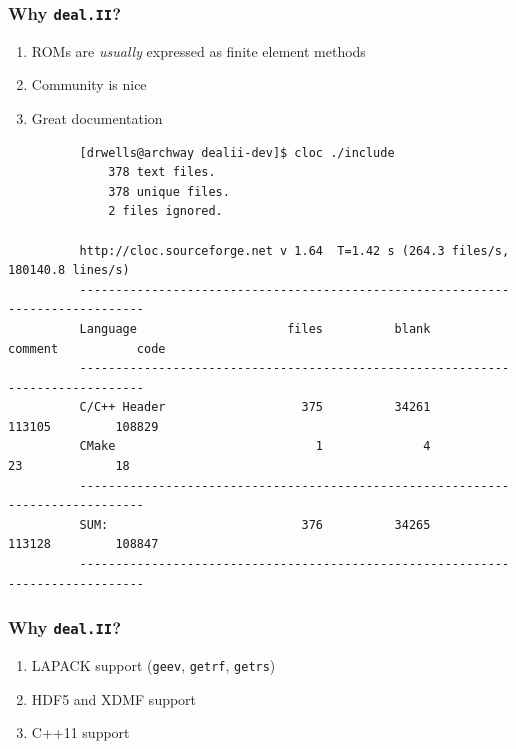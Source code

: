 \documentclass[mathserif]{beamer}
\begin{document}
\begin{frame}[fragile]
    \frametitle{Why \texttt{deal.II}?}
    \begin{enumerate}
        \item ROMs are \emph{usually} expressed as finite element methods
        \pause
        \item Community is nice
        \pause
        \item Great documentation
    \end{enumerate}

    \pause
    \begin{center}
        {\tiny
        \begin{verbatim}
          [drwells@archway dealii-dev]$ cloc ./include
              378 text files.
              378 unique files.
              2 files ignored.

          http://cloc.sourceforge.net v 1.64  T=1.42 s (264.3 files/s, 180140.8 lines/s)
          -------------------------------------------------------------------------------
          Language                     files          blank        comment           code
          -------------------------------------------------------------------------------
          C/C++ Header                   375          34261         113105         108829
          CMake                            1              4             23             18
          -------------------------------------------------------------------------------
          SUM:                           376          34265         113128         108847
          -------------------------------------------------------------------------------
          \end{verbatim}
        }
    \end{center}
\end{frame}

\begin{frame}
    \frametitle{Why \texttt{deal.II}?}
    \begin{enumerate}
        \item LAPACK support (\texttt{geev}, \texttt{getrf}, \texttt{getrs})
        \item HDF5 and XDMF support
        \item C++11 support
    \end{enumerate}
\end{frame}
\end{document}
